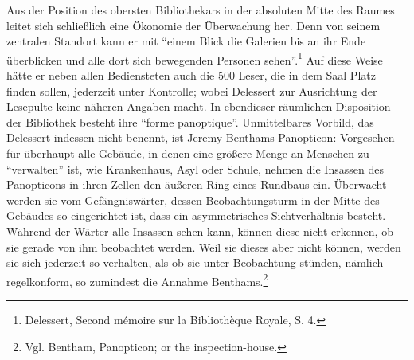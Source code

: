 Aus der Position des obersten Bibliothekars in der absoluten Mitte des
Raumes leitet sich schließlich eine Ökonomie der Überwachung her. Denn
von seinem zentralen Standort kann er mit \enquote{einem Blick die
Galerien bis an ihr Ende überblicken und alle dort sich bewegenden
Personen sehen}.\footnote{Delessert, Second mémoire sur la Bibliothèque
  Royale, S. 4.} Auf diese Weise hätte er neben allen Bediensteten auch
die 500 Leser, die in dem Saal Platz finden sollen, jederzeit unter
Kontrolle; wobei Delessert zur Ausrichtung der Lesepulte keine näheren
Angaben macht. In ebendieser räumlichen Disposition der Bibliothek
besteht ihre \enquote{forme panoptique}. Unmittelbares Vorbild, das
Delessert indessen nicht benennt, ist Jeremy Benthams Panopticon:
Vorgesehen für überhaupt alle Gebäude, in denen eine größere Menge an
Menschen zu \enquote{verwalten} ist, wie Krankenhaus, Asyl oder Schule,
nehmen die Insassen des Panopticons in ihren Zellen den äußeren Ring
eines Rundbaus ein. Überwacht werden sie vom Gefängniswärter, dessen
Beobachtungsturm in der Mitte des Gebäudes so eingerichtet ist, dass ein
asymmetrisches Sichtverhältnis besteht. Während der Wärter alle Insassen
sehen kann, können diese nicht erkennen, ob sie gerade von ihm
beobachtet werden. Weil sie dieses aber nicht können, werden sie sich
jederzeit so verhalten, als ob sie unter Beobachtung stünden, nämlich
regelkonform, so zumindest die Annahme Benthams.\footnote{Vgl. Bentham,
  Panopticon; or the inspection-house.}

